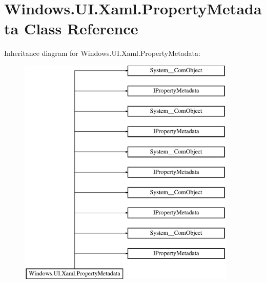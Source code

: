 \hypertarget{class_windows_1_1_u_i_1_1_xaml_1_1_property_metadata}{}\section{Windows.\+U\+I.\+Xaml.\+Property\+Metadata Class Reference}
\label{class_windows_1_1_u_i_1_1_xaml_1_1_property_metadata}
Inheritance diagram for Windows.\+U\+I.\+Xaml.\+Property\+Metadata\+:\begin{figure}[H]
\begin{center}
\leavevmode
\includegraphics[height=11.000000cm]{class_windows_1_1_u_i_1_1_xaml_1_1_property_metadata}
\end{center}
\end{figure}

